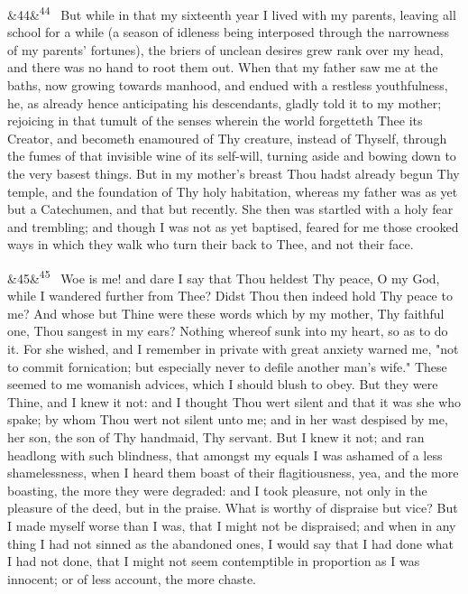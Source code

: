 \documentclass[12pt]{article}
\newcommand{\para}[1][]{\par\noindent\ifx&#1&\else\textsuperscript{\footnotesize #1}~\fi}
\begin{document}
\para[44] But while in that my sixteenth year I lived with my parents, leaving all school for a while (a season of idleness being interposed through the narrowness of my parents' fortunes), the briers of unclean desires grew rank over my head, and there was no hand to root them out. When that my father saw me at the baths, now growing towards manhood, and endued with a restless youthfulness, he, as already hence anticipating his descendants, gladly told it to my mother; rejoicing in that tumult of the senses wherein the world forgetteth Thee its Creator, and becometh enamoured of Thy creature, instead of Thyself, through the fumes of that invisible wine of its self-will, turning aside and bowing down to the very basest things. But in my mother's breast Thou hadst already begun Thy temple, and the foundation of Thy holy habitation, whereas my father was as yet but a Catechumen, and that but recently. She then was startled with a holy fear and trembling; and though I was not as yet baptised, feared for me those crooked ways in which they walk who turn their back to Thee, and not their face.

\para[45] Woe is me! and dare I say that Thou heldest Thy peace, O my God, while I wandered further from Thee? Didst Thou then indeed hold Thy peace to me? And whose but Thine were these words which by my mother, Thy faithful one, Thou sangest in my ears? Nothing whereof sunk into my heart, so as to do it. For she wished, and I remember in private with great anxiety warned me, "not to commit fornication; but especially never to defile another man's wife." These seemed to me womanish advices, which I should blush to obey. But they were Thine, and I knew it not: and I thought Thou wert silent and that it was she who spake; by whom Thou wert not silent unto me; and in her wast despised by me, her son, the son of Thy handmaid, Thy servant. But I knew it not; and ran headlong with such blindness, that amongst my equals I was ashamed of a less shamelessness, when I heard them boast of their flagitiousness, yea, and the more boasting, the more they were degraded: and I took pleasure, not only in the pleasure of the deed, but in the praise. What is worthy of dispraise but vice? But I made myself worse than I was, that I might not be dispraised; and when in any thing I had not sinned as the abandoned ones, I would say that I had done what I had not done, that I might not seem contemptible in proportion as I was innocent; or of less account, the more chaste.
\end{document}
